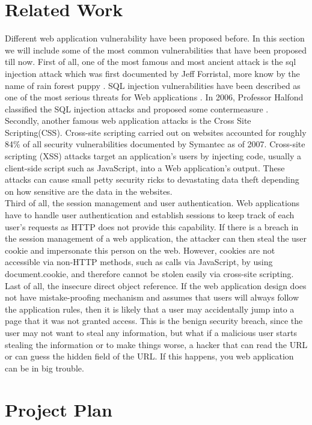 \documentclass[12pt, a4paper]{article}
\begin{document}
\section{Related Work}
Different web application vulnerability have been proposed before. In this section we will include some of the most common vulnerabilities that have been proposed till now. First of all, one of the most famous and most ancient attack is the sql injection attack which was first documented by Jeff Forristal, more know by the name of rain forest puppy \cite{Jeff}.  SQL injection vulnerabilities have been described as one of the most serious threats for Web applications \cite{Aucsmith} \cite{TO}. In 2006, Professor Halfond classified the SQL injection attacks and proposed some contermeasure \cite{halfond06mar}.\\

Secondly, another famous web application attacks is the Cross Site Scripting(CSS). Cross-site scripting carried out on websites accounted for roughly 84\% of all security vulnerabilities documented by Symantec as of 2007\cite{symantec}. Cross-site scripting (XSS) attacks target an application's users by injecting code, usually a client-side script such as JavaScript, into a Web application's output. These attacks can cause small petty security ricks to devastating data theft depending on how sensitive are the data in the websites.\\

Third of all, the session management and user authentication. Web applications have to handle user authentication and establish sessions to keep track of each user's requests as HTTP does not provide this capability. If there is a breach in the session management of a web application, the attacker can then steal the user cookie and impersonate this person on the web. However, cookies are not accessible via non-HTTP methods, such as calls via JavaScript, by using document.cookie, and therefore cannot be stolen easily via cross-site scripting\cite{symantec}.\\

Last of all, the insecure direct object reference. If the web application design does not have mistake-proofing mechanism and assumes that users will always follow the application rules, then it is likely that a user may accidentally jump into a page that it was not granted access. This is the benign security breach, since the user may not want to steal any information, but what if a malicious user starts stealing the information or to make things worse, a hacker that can read the URL or can guess the hidden field of the URL\cite{Michael}. If this happens, you web application can be in big trouble.


\section{Project Plan}



\end{document}
